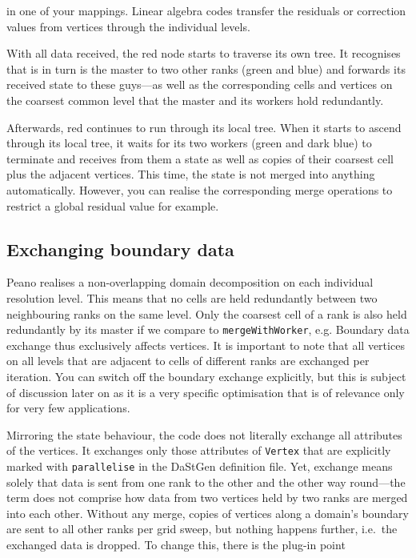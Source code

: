 \noindent
in one of your mappings. 
Linear algebra codes transfer the residuals or correction values from vertices
through the individual levels.


With all data received, the red node starts to traverse its own tree. 
It recognises that is in turn is the master to two other ranks (green and blue)
and forwards its received state to these guys---as well as the corresponding
cells and vertices on the coarsest common level that the master and its workers
hold redundantly.

Afterwards, red continues to run through its local tree. 
When it starts to ascend through its local tree, it waits for its two workers
(green and dark blue) to terminate and receives from them a state as well as
copies of their coarsest cell plus the adjacent vertices.
This time, the state is not merged into anything automatically. 
However, you can realise the corresponding merge operations to restrict a global
residual value for example.


\subsection{Exchanging boundary data}

Peano realises a non-overlapping domain decomposition on each individual
resolution level.
This means that no cells are held redundantly between two neighbouring ranks on
the same level.
Only the coarsest cell of a rank is also held redundantly by its
master if we compare to \texttt{mergeWithWorker}, e.g.
Boundary data exchange thus exclusively affects vertices. 
It is important to note that all vertices on all levels that are adjacent to
cells of different ranks are exchanged per iteration.
You can switch off the boundary exchange explicitly, but this is subject of
discussion later on as it is a very specific optimisation that is of relevance
only for very few applications.


Mirroring the state behaviour, the code does not literally exchange all
attributes of the vertices.
It exchanges only those attributes of \texttt{Vertex} that are explicitly marked
with \texttt{parallelise} in the DaStGen definition file.  
Yet, exchange means solely that data is sent from one rank to the other and the
other way round---the term does not comprise how data from two vertices held by
two ranks are merged into each other.
Without any merge, copies of vertices along a domain's boundary are sent to all
other ranks per grid sweep, but nothing happens further, i.e.~the exchanged data
is dropped.
To change this, there is the plug-in point

